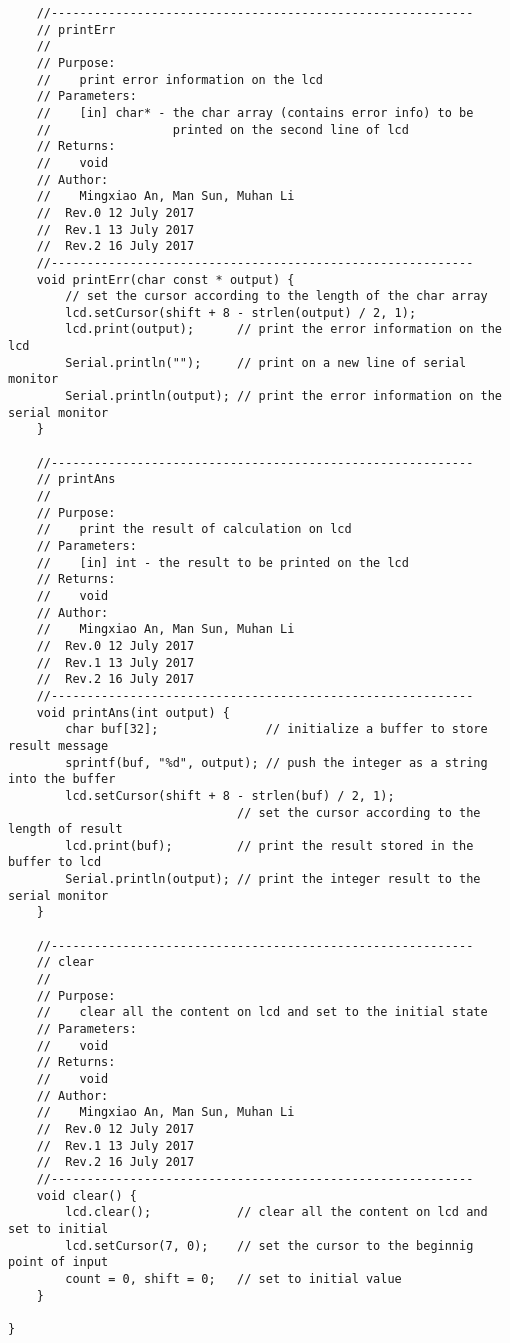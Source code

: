 \begin{verbatim}
    //-----------------------------------------------------------  
    // printErr 
    //
    // Purpose:  
    //    print error information on the lcd  
    // Parameters:  
    //    [in] char* - the char array (contains error info) to be 
    //                 printed on the second line of lcd
    // Returns:  
    //    void  
    // Author:  
    //    Mingxiao An, Man Sun, Muhan Li
    //  Rev.0 12 July 2017
    //  Rev.1 13 July 2017
    //  Rev.2 16 July 2017
    //----------------------------------------------------------- 
    void printErr(char const * output) {
        // set the cursor according to the length of the char array 
        lcd.setCursor(shift + 8 - strlen(output) / 2, 1);
        lcd.print(output);      // print the error information on the lcd
        Serial.println("");     // print on a new line of serial monitor
        Serial.println(output); // print the error information on the serial monitor
    }

    //-----------------------------------------------------------  
    // printAns 
    //  
    // Purpose:  
    //    print the result of calculation on lcd 
    // Parameters:  
    //    [in] int - the result to be printed on the lcd  
    // Returns:  
    //    void  
    // Author:  
    //    Mingxiao An, Man Sun, Muhan Li
    //  Rev.0 12 July 2017
    //  Rev.1 13 July 2017
    //  Rev.2 16 July 2017
    //----------------------------------------------------------- 
    void printAns(int output) {
        char buf[32];               // initialize a buffer to store result message
        sprintf(buf, "%d", output); // push the integer as a string into the buffer
        lcd.setCursor(shift + 8 - strlen(buf) / 2, 1);
                                // set the cursor according to the length of result
        lcd.print(buf);         // print the result stored in the buffer to lcd 
        Serial.println(output); // print the integer result to the serial monitor
    }

    //-----------------------------------------------------------  
    // clear
    //  
    // Purpose:  
    //    clear all the content on lcd and set to the initial state 
    // Parameters:  
    //    void
    // Returns:  
    //    void  
    // Author:  
    //    Mingxiao An, Man Sun, Muhan Li
    //  Rev.0 12 July 2017
    //  Rev.1 13 July 2017
    //  Rev.2 16 July 2017
    //----------------------------------------------------------- 
    void clear() {
        lcd.clear();            // clear all the content on lcd and set to initial              
        lcd.setCursor(7, 0);    // set the cursor to the beginnig point of input
        count = 0, shift = 0;   // set to initial value
    }
    
}

\end{verbatim}

